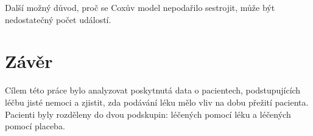 \documentclass[a4, 11pt]{article}
\theoremstyle{definition}
\newtheorem{temppostulateforbackground}{Postulate}
\newenvironment{postulate}
{
	\colorlet{shadecolor}{orange!15}
	\begin{shaded} \vspace{-10pt}
		\begin{temppostulateforbackground}
		}
		{
		\end{temppostulateforbackground} \vspace{-10pt}
	\end{shaded}
}
\theoremstyle{remark}
\begin{document}
    Další možný důvod, proč se Coxův model nepodařilo sestrojit, může být nedostatečný počet událostí.

    
%        
%        
%        
%        
%        
%        
    
	
	\section{Závěr}\label{sec:zaver}
	Cílem této práce bylo analyzovat poskytnutá data o pacientech, podstupujících léčbu jisté nemoci a zjistit, zda podávání léku mělo vliv na dobu přežití pacienta. Pacienti byly rozděleny do dvou podskupin: léčených pomocí léku a léčených pomocí placeba. 
    
\end{document}
